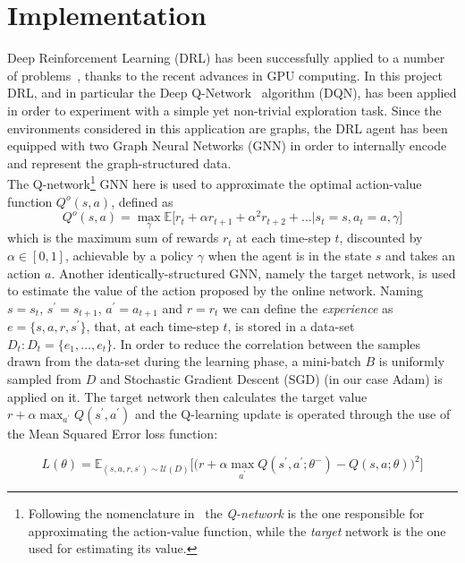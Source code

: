 \documentclass[a4paper]{article}
\begin{document}
\section{Implementation}
Deep Reinforcement Learning (DRL) has been successfully applied to a number of problems~\cite{deeprl}, thanks to the recent
advances in GPU computing. In this project DRL, and in particular the Deep Q-Network~\cite{mnih2015humanlevel} algorithm (DQN), has been applied in order to experiment with a simple yet non-trivial exploration task. Since the environments considered in this application are graphs, the DRL agent has been equipped with two Graph Neural Networks\cite{gnn} (GNN) in order to internally encode and represent the graph-structured data.\\
The Q-network\footnote{Following the nomenclature in~\cite{mnih2015humanlevel} the \textit{Q-network} is the one responsible for approximating the action-value function, while the \textit{target} network is the one used for estimating its value.} GNN here is used to approximate the optimal action-value function $Q^o(s, a)$, defined as
\begin{equation}
    Q^o(s, a) = \max_{\gamma} \mathbb{E} \Big [r_t + \alpha r_{t+1} + \alpha^2 r_{t+2} + \dots | s_t = s, a_t = a, \gamma \Big ]
\end{equation}
which is the maximum sum of rewards $r_t$ at each time-step $t$, discounted by $\alpha \in [0,1]$, achievable by a policy $\gamma$ when the agent is in the state $s$ and takes an action $a$. Another identically-structured GNN, namely the target network, is used to estimate the value of the action proposed by the online network.
Naming $s = s_t$, $s^{\prime} = s_{t+1}$, $a^{\prime} = a_{t+1}$ and $r = r_t$ we can define the \textit{experience} as $e = \{s, a, r, s^{\prime}\}$, that, at each time-step $t$, is stored in a data-set $D_t : D_t = \{e_1, \dots, e_t\}$. In order to reduce the correlation between the samples drawn from the data-set during the learning phase, a mini-batch $B$ is uniformly sampled from $D$ and Stochastic Gradient Descent (SGD) (in our case Adam) is applied on it. The target network then calculates the target value $r + \alpha \max_{a^{\prime}} Q(s^{\prime}, a^{\prime})$ and the Q-learning update is operated through the use of the Mean Squared Error loss function:

\begin{equation}
    L(\theta) = \mathbb{E}_{(s,a,r,s^{\prime}) \sim \mathcal{U}(D)} \Big [ \big ( r + \alpha \max_{a^{\prime}} Q(s^{\prime}, a^{\prime}; \theta^{-}) - Q(s, a; \theta) \big )^2 \Big ]
\end{equation}
\end{document}
